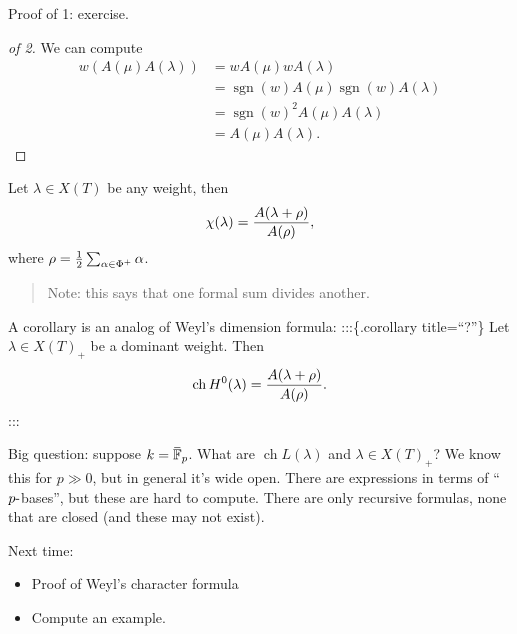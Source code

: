 Proof of 1: exercise.

\begin{proof}[of 2]

We can compute
\begin{align*}  
w(A(\mu) A(\lambda) ) 
&= w A(\mu)  w A(\lambda) \\
&= \operatorname{sgn}(w) A(\mu)  \operatorname{sgn}(w) A(\lambda) \\
&= \operatorname{sgn}(w)^2 A(\mu) A(\lambda) \\
&= A(\mu) A(\lambda)
.\end{align*}

\end{proof}

\begin{theorem}

Let \(\lambda \in X(T)\) be any weight, then
\begin{align*}  
\chi(\lambda) = { A(\lambda + \rho) \over A(\rho) }
,\end{align*}
where \(\rho = {1\over 2} \sum_{\alpha \in \Phi^+} \alpha\).

\end{theorem}

\begin{quote}
Note: this says that one formal sum divides another.
\end{quote}

A corollary is an analog of Weyl's dimension formula: :::\{.corollary
title=``?''\} Let \(\lambda \in X(T)_+\) be a dominant weight. Then
\begin{align*}  
\operatorname{ch}H^0(\lambda) = { A(\lambda + \rho) \over A(\rho) }
.\end{align*}
:::

Big question: suppose
\(k = \mkern 1.5mu\overline{\mkern-1.5mu{\mathbb{F}}\mkern-1.5mu}\mkern 1.5mu_p\).
What are \(\operatorname{ch}L(\lambda)\) and \(\lambda \in X(T)_+\)? We
know this for \(p\gg 0\), but in general it's wide open. There are
expressions in terms of ``\(p{\hbox{-}}\)bases'', but these are hard to
compute. There are only recursive formulas, none that are closed (and
these may not exist).

Next time:

\begin{itemize}
\tightlist
\item
  Proof of Weyl's character formula
\item
  Compute an example.
\end{itemize}

